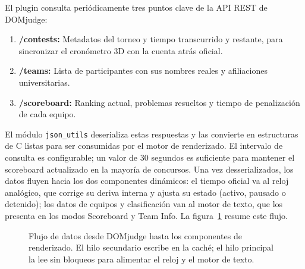 El plugin consulta periódicamente tres puntos clave de la API REST de DOMjudge:
 
\begin{enumerate}
    \item \textbf{/contests:} Metadatos del torneo y tiempo transcurrido y restante, para
    sincronizar el cronómetro 3D con la cuenta atrás oficial.
    \item \textbf{/teams:} Lista de participantes con sus nombres reales y afiliaciones
    universitarias.
    \item \textbf{/scoreboard:} Ranking actual, problemas resueltos y tiempo de penalización de
    cada equipo.
\end{enumerate}
 
El módulo \texttt{json\_utils} deserializa estas respuestas y las convierte en estructuras de C
listas para ser consumidas por el motor de renderizado. El intervalo de consulta es configurable;
un valor de 30 segundos es suficiente para mantener el scoreboard actualizado en la mayoría de
concursos. Una vez desserializados, los datos fluyen hacia los dos componentes dinámicos: el
tiempo oficial va al reloj analógico, que corrige su deriva interna y ajusta su estado (activo,
pausado o detenido); los datos de equipos y clasificación van al motor de texto, que los
presenta en los modos Scoreboard y Team Info. La figura~\ref{fig:flujo_datos} resume este flujo.
 
\begin{figure}[H]
\centering
{}
\caption{Flujo de datos desde DOMjudge hasta los componentes de renderizado. El hilo secundario
escribe en la caché; el hilo principal la lee sin bloqueos para alimentar el reloj y el motor
de texto.}
\label{fig:flujo_datos}
\end{figure}
 
